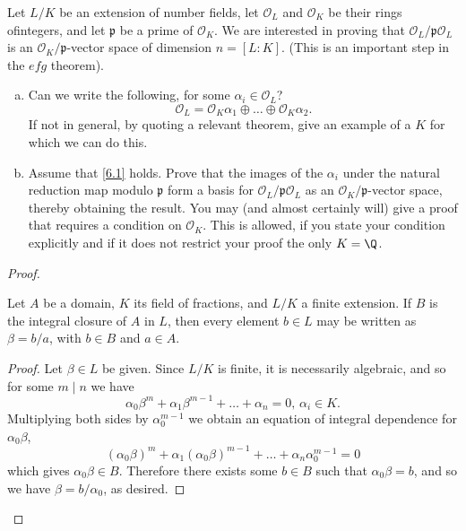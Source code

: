 \documentclass[10pt]{amsart}
\begin{document}
\begin{thm}\label{Ex6}
	Let $L/K$ be an extension of number fields, let $\mathcal{O}_L$ and $\mathcal{O}_K$ be their rings ofintegers, and let $\mathfrak{p}$ be a prime of $\mathcal{O}_K$.
	We are interested in proving that $\mathcal{O}_L/\mathfrak{p}\mathcal{O}_L$ is an $\mathcal{O}_K/\mathfrak{p}$-vector space of dimension $n = [L : K]$.
	(This is an important step in the $efg$ theorem).
	\begin{enumerate}[(a)]
		\item
		Can we write the following, for some $\alpha_i \in \mathcal{O}_L$?
		\begin{equation}\label{6.1}
			\mathcal{O}_L = \mathcal{O}_K\alpha_1 \oplus \ldots \oplus \mathcal{O}_K\alpha_2.
		\end{equation}
		If not in general, by quoting a relevant theorem, give an example of a $K$ for which we can do this.
		\item
		Assume that \eqref{6.1} holds.
		Prove that the images of the $\alpha_i$ under the natural reduction map modulo $\mathfrak{p}$ form a basis for $\mathcal{O}_L/\mathfrak{p}\mathcal{O}_L$ as an $\mathcal{O}_K/\mathfrak{p}$-vector space, thereby obtaining the result.
		You may (and almost certainly will) give a proof that requires a condition on $\mathcal{O}_K$.
		This is allowed, if you state your condition explicitly and if it does not restrict your proof the only $K = \Q$.
	\end{enumerate}
	\begin{proof}
		\begin{lem}\label{L.6.1}
			Let $A$ be a domain, $K$ its field of fractions, and $L/K$ a finite extension.  
			If $B$ is the integral closure of $A$ in $L$, then every element $b \in L$ may be written as $\beta = b/a$, with $b \in B$ and $a \in A$.
		\begin{proof}
			Let $\beta \in L$ be given.
			Since $L/K$ is finite, it is necessarily algebraic, and so for some $m \mid n$ we have
			$$\alpha_0\beta^m + \alpha_1\beta^{m-1} + \ldots + \alpha_n = 0,\, \alpha_i \in K.$$
			Multiplying both sides by $\alpha_0^{m-1}$ we obtain an equation of integral dependence for $\alpha_0\beta$,
			$$\left(\alpha_0\beta\right)^m + \alpha_1(\alpha_0\beta)^{m-1} + \ldots + \alpha_n\alpha_0^{m-1} = 0$$
			which gives $\alpha_0\beta \in B$.
			Therefore there exists some $b \in B$ such that $\alpha_0\beta = b$, and so we have $\beta = b/\alpha_0$, as desired.
		\end{proof}
		\end{lem}


\end{proof}
\end{thm}
\end{document}
